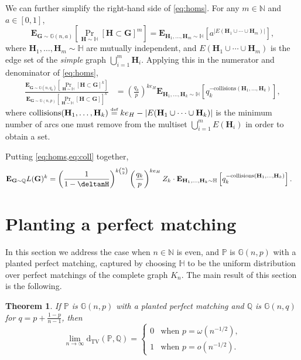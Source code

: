 \documentclass[11pt]{article}
\providecommand{\N}{}
\renewcommand{\N}{{\mathbb N}}
\newcommand{\e}{{\mathbf E}}
\newcommand{\dtv}{\mathrm{d}_{\mathrm{TV}}}
\newcommand{\bG}{\mathbf{G}}
\newcommand{\bH}{\mathbf{H}}
\newcommand{\bbG}{\mathbb{G}}
\newcommand{\bbH}{\mathbb{H}}
\newcommand{\bbP}{\mathbb{P}}
\newcommand{\bbQ}{\mathbb{Q}}
\newcommand\defeq{\stackrel{\text{\tiny def}}{=}}
\newtheorem{thm}{Theorem}
\numberwithin{equation}{section}
\numberwithin{thm}{section}
\begin{document}
We can further simplify the right-hand side of \cref{eq:homs}. 
For any $m \in \N$ and $a \in [0,1]$,
\[
\e_{\bG \sim \bbG(n,a)} \left[ \Pr_{\bH \sim \bbH}[\bH\subset\bG]^m \right]
= \e_{\bH_1,\ldots,\bH_m \sim \bbH} \left[ a^{|E(\bH_1 \cup \cdots \cup \bH_m)|} \right],
\]
where $\bH_1,\ldots,\bH_m \sim \bbH$ are mutually independent, and 
 $E(\bH_1 \cup \cdots \cup \bH_m)$ is the edge set of the \emph{simple} graph $\bigcup_{i=1}^m \bH_i$.
Applying this in the numerator and denominator of \cref{eq:homs},
\begin{align}
\frac{\e_{\bG \sim \bbG(n,q_k)}\left[\Pr_{\bH \sim \bbH}[\bH\subset\bG]^k\right]}{\e_{\bG \sim \bbG(n,p)}[\Pr_{\bH\sim \bbH}[\bH\subset\bG]]^k}
&= \left(\frac{q_k}{p}\right)^{k e_H} \e_{\bH_1,\ldots,\bH_k \sim \bbH} \left[q_k^{-\mathrm{collisions}(\bH_1,\ldots,\bH_k)}\right],\label{eq:coll}
\end{align}
where 
$\mathrm{collisions}(\bH_1,\ldots,\bH_k) 
\defeq k e_{H} - |E(\bH_1 \cup \cdots \cup \bH_k)|$ 
is the minimum number of arcs one must remove from the multiset $\bigcup_{i=1}^m E(\bH_i)$ in order to obtain a set.

Putting \cref{eq:homs,eq:coll} together,
\begin{align}
\e_{\bG \sim \bbQ} L(\bG)^k
&= 
\left(\frac{1}{1-\deltanH}\right)^{k\binom{n}{2}}\left(\frac{q_k}{p}\right)^{k e_H} Z_k \cdot  \e_{\bH_1,\ldots,\bH_k \sim \bbH} \left[q_k^{-\mathrm{collisions}(\bH_1,\ldots,\bH_k)}\right].\label{eq:coll-simple}
\end{align}

\section{Planting a perfect matching}
\label{sec:PM}

In this section we address the case when $n \in \N$ is even, and $\bbP$ is $\bbG(n,p)$ with a planted perfect matching, captured by choosing $\bbH$ to be the uniform distribution over perfect matchings of the complete graph $K_n$.
The main result of this section is the following.
\begin{thm}\label{thm:matching}
If $\bbP$ is $\bbG(n,p)$ with a planted perfect matching and $\bbQ$ is $\bbG(n,q)$ for $q = p + \frac{1-p}{n-1}$, then
\[
\lim_{n \to \infty} \dtv(\bbP,\bbQ) = \begin{cases}
0 & \text{when }p = \omega(n^{-1/2}),\\
1 & \text{when }p = o(n^{-1/2}).
\end{cases}
\]
\end{thm}
\end{document}
